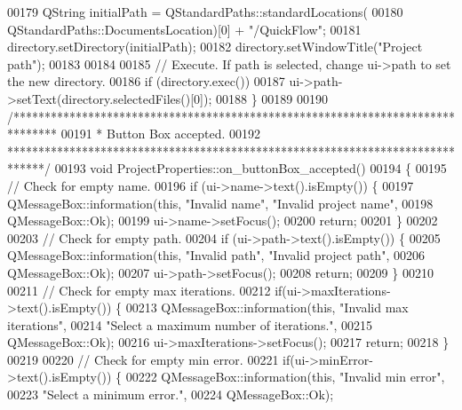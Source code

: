 \begin{DoxyCode}
00179   QString initialPath = QStandardPaths::standardLocations(
00180                           QStandardPaths::DocumentsLocation)[0] + \textcolor{stringliteral}{"/QuickFlow"};
00181   directory.setDirectory(initialPath);
00182   directory.setWindowTitle(\textcolor{stringliteral}{"Project path"});
00183 
00184 
00185   \textcolor{comment}{// Execute. If path is selected, change ui->path to set the new directory.}
00186   \textcolor{keywordflow}{if} (directory.exec())
00187     ui->path->setText(directory.selectedFiles()[0]);
00188 \}
00189 
00190 \textcolor{comment}{/*******************************************************************************}
00191 \textcolor{comment}{ * Button Box accepted.}
00192 \textcolor{comment}{ ******************************************************************************/}
00193 \textcolor{keywordtype}{void} ProjectProperties::on\_buttonBox\_accepted()
00194 \{
00195   \textcolor{comment}{// Check for empty name.}
00196   \textcolor{keywordflow}{if} (ui->name->text().isEmpty()) \{
00197     QMessageBox::information(\textcolor{keyword}{this}, \textcolor{stringliteral}{"Invalid name"}, \textcolor{stringliteral}{"Invalid project name"},
00198                              QMessageBox::Ok);
00199     ui->name->setFocus();
00200     \textcolor{keywordflow}{return};
00201   \}
00202 
00203   \textcolor{comment}{// Check for empty path.}
00204   \textcolor{keywordflow}{if} (ui->path->text().isEmpty()) \{
00205     QMessageBox::information(\textcolor{keyword}{this}, \textcolor{stringliteral}{"Invalid path"}, \textcolor{stringliteral}{"Invalid project path"},
00206                              QMessageBox::Ok);
00207     ui->path->setFocus();
00208     \textcolor{keywordflow}{return};
00209   \}
00210 
00211   \textcolor{comment}{// Check for empty max iterations.}
00212   \textcolor{keywordflow}{if}(ui->maxIterations->text().isEmpty()) \{
00213     QMessageBox::information(\textcolor{keyword}{this}, \textcolor{stringliteral}{"Invalid max iterations"},
00214                              \textcolor{stringliteral}{"Select a maximum number of iterations."},
00215                              QMessageBox::Ok);
00216     ui->maxIterations->setFocus();
00217     \textcolor{keywordflow}{return};
00218   \}
00219 
00220   \textcolor{comment}{// Check for empty min error.}
00221   \textcolor{keywordflow}{if}(ui->minError->text().isEmpty()) \{
00222     QMessageBox::information(\textcolor{keyword}{this}, \textcolor{stringliteral}{"Invalid min error"},
00223                              \textcolor{stringliteral}{"Select a minimum error."},
00224                              QMessageBox::Ok);

\end{DoxyCode}
